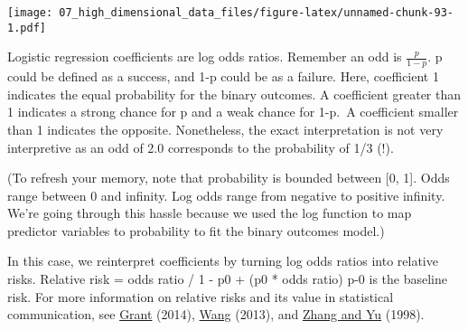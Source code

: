 \documentclass[
]{book}
\newenvironment{Shaded}{\begin{snugshade}}{\end{snugshade}}
\newcommand{\CommentTok}[1]{\textcolor[rgb]{0.56,0.35,0.01}{\textit{#1}}}
\newcommand{\ControlFlowTok}[1]{\textcolor[rgb]{0.13,0.29,0.53}{\textbf{#1}}}
\newcommand{\DecValTok}[1]{\textcolor[rgb]{0.00,0.00,0.81}{#1}}
\newcommand{\FunctionTok}[1]{\textcolor[rgb]{0.00,0.00,0.00}{#1}}
\newcommand{\NormalTok}[1]{#1}
\newcommand{\OtherTok}[1]{\textcolor[rgb]{0.56,0.35,0.01}{#1}}
\newcommand{\SpecialCharTok}[1]{\textcolor[rgb]{0.00,0.00,0.00}{#1}}
\newcommand{\StringTok}[1]{\textcolor[rgb]{0.31,0.60,0.02}{#1}}
\begin{document}
\texttt{[image: 07\_high\_dimensional\_data\_files/figure-latex/unnamed-chunk-93-1.pdf]}

Logistic regression coefficients are log odds ratios. Remember an odd is \(\frac{p}{1-p}\). p could be defined as a success, and 1-p could be as a failure. Here, coefficient 1 indicates the equal probability for the binary outcomes. A coefficient greater than 1 indicates a strong chance for p and a weak chance for 1-p.~A coefficient smaller than 1 indicates the opposite. Nonetheless, the exact interpretation is not very interpretive as an odd of 2.0 corresponds to the probability of 1/3 (!).

(To refresh your memory, note that probability is bounded between {[}0, 1{]}. Odds range between 0 and infinity. Log odds range from negative to positive infinity. We're going through this hassle because we used the log function to map predictor variables to probability to fit the binary outcomes model.)

In this case, we reinterpret coefficients by turning log odds ratios into relative risks. Relative risk = odds ratio / 1 - p0 + (p0 * odds ratio) p-0 is the baseline risk. For more information on relative risks and its value in statistical communication, see \href{https://www.bmj.com/content/348/bmj.f7450}{Grant} (2014), \href{https://www.jstatsoft.org/article/view/v055i05}{Wang} (2013), and \href{https://jamanetwork.com/journals/jama/fullarticle/188182}{Zhang and Yu} (1998).

\begin{Shaded}
\end{Shaded}
\end{document}
